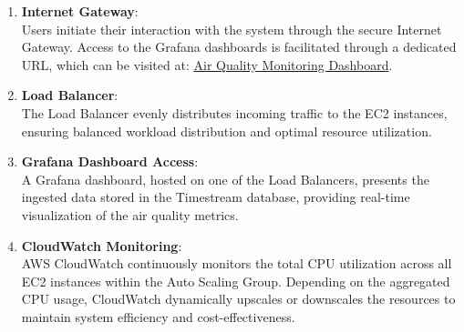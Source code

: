 \documentclass[12pt,oneside]{book} %
\begin{document}
\begin{enumerate}
    \item \textbf{Internet Gateway}: \\
          Users initiate their interaction with the system through the secure Internet Gateway. Access to the Grafana dashboards is facilitated through a dedicated URL, which can be visited at: \href{http://grafana-1777174802.us-east-1.elb.amazonaws.com/d/f8742187-f440-4ee8-96cc-bad5af8edef1/air-quality-monitoring}{Air Quality Monitoring Dashboard}.

    \item \textbf{Load Balancer}: \\
          The Load Balancer evenly distributes incoming traffic to the EC2 instances, ensuring balanced workload distribution and optimal resource utilization.

    \item \textbf{Grafana Dashboard Access}: \\
          A Grafana dashboard, hosted on one of the Load Balancers, presents the ingested data stored in the Timestream database, providing real-time visualization of the air quality metrics.

    \item \textbf{CloudWatch Monitoring}: \\
          AWS CloudWatch continuously monitors the total CPU utilization across all EC2 instances within the Auto Scaling Group. Depending on the aggregated CPU usage, CloudWatch dynamically upscales or downscales the resources to maintain system efficiency and cost-effectiveness.
\end{enumerate}
\end{document}
